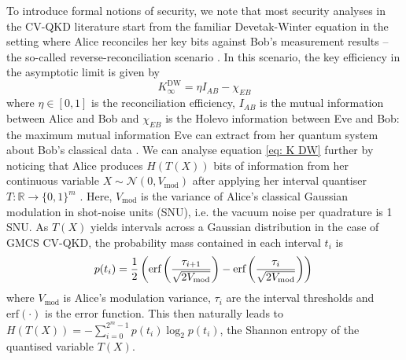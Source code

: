 ﻿\documentclass[12pt]{article}
\begin{document}
To introduce formal notions of security, we note that most security analyses in the CV-QKD literature start from the familiar Devetak-Winter equation in the setting where Alice reconciles her key bits against Bob's measurement results -- the so-called reverse-reconciliation scenario \cite{Diamanti-2015, Usenko-2025}. In this scenario, the key efficiency in the asymptotic limit is given by 
\begin{equation}
  \label{eq: K DW}
  K_\infty^\text{DW} = \eta I_{AB} - \chi_{EB}
\end{equation}
where $\eta \in [0, 1]$ is the reconciliation efficiency, $I_{AB}$ is the mutual information between Alice and Bob and $\chi_{EB}$ is the Holevo information between Eve and Bob: the maximum mutual information Eve can extract from her quantum system about Bob's classical data \cite{Devetak-2005}. We can analyse equation \eqref{eq: K DW} further by noticing that Alice produces $H(T(X))$ bits of information from her continuous variable $X \sim \mathcal{N}(0, V_\text{mod})$ after applying her interval quantiser $T : \mathbb{R} \rightarrow \{0, 1\}^m$ \cite{VanAssche-2004, Gray-1998}. Here, $V_\text{mod}$ is the variance of Alice's classical Gaussian modulation in shot-noise units (SNU), i.e. the vacuum noise per quadrature is 1 SNU. As $T(X)$ yields intervals across a Gaussian distribution in the case of GMCS CV-QKD, the probability mass contained in each interval $t_i$ is \cite{VanAssche-2004}
\begin{equation}
  \label{p interval}
  p(t_i) = \frac{1}{2}\left(\text{erf} \left(\frac{\tau_{i+1}}{\sqrt{2V_\text{mod}}}\right) - \text{erf}\left(\frac{\tau_i}{\sqrt{2V_\text{mod}}}\right) \right) \\
\end{equation}
where $V_\text{mod}$ is Alice's modulation variance, $\tau_i$ are the interval thresholds and $\text{erf}(\cdot)$ is the error function. This then naturally leads to $H(T(X)) = -\sum_{i=0}^{2^m - 1} p(t_i) \log_2 p(t_i)$, the Shannon entropy of the quantised variable $T(X)$. 
\end{document}
